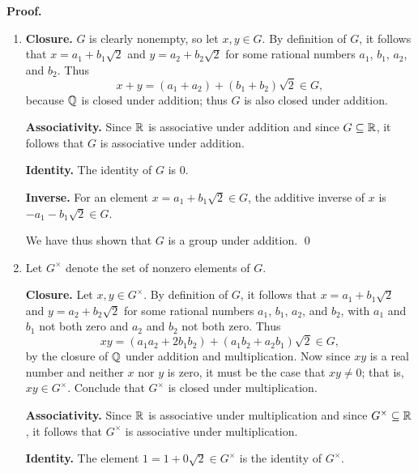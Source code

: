 \begin{enumerate}
      \textbf{Proof.}
      
      \begin{enumerate}
         \item \textbf{Closure.} $G$ is clearly nonempty, so let $x, y \in G$.
               By definition of $G$, it follows that $x = a_1 + b_1\sqrt{2}$ and
               $y = a_2 + b_2\sqrt{2}$ for some rational numbers $a_1$, $b_1$,
               $a_2$, and $b_2$. Thus
               $$x + y = (a_1 + a_2) + (b_1 + b_2)\sqrt{2} \in G,$$
               because $\mathbb{Q}$ is closed under addition; thus $G$ is also closed 
               under addition.
               
               \textbf{Associativity.} Since $\mathbb{R}$ is associative under addition
               and since $G \subseteq \mathbb{R}$, it follows that $G$ is associative
               under addition.
               
               \textbf{Identity.} The identity of $G$ is 0.
               
               \textbf{Inverse.} For an element $x = a_1 + b_1\sqrt{2} \in G$,
               the additive inverse of $x$ is $-a_1 - b_1\sqrt{2} \in G$.
               
               We have thus shown that $G$ is a group under addition. \qed
         \item Let $G^{\times}$ denote the set of nonzero elements of $G$.
         
               \textbf{Closure.} Let $x, y \in G^{\times}$. By definition of
               $G$, it follows that $x = a_1 + b_1\sqrt{2}$ and
               $y = a_2 + b_2\sqrt{2}$ for some rational numbers $a_1$, $b_1$,
               $a_2$, and $b_2$, with $a_1$ and $b_1$ not both zero and $a_2$
               and $b_2$ not both zero. Thus
               $$xy = (a_1a_2 + 2b_1b_2) + (a_1b_2 + a_2b_1)\sqrt{2} \in G,$$
               by the closure of $\mathbb{Q}$ under addition and multiplication. Now
               since $xy$ is a real number and neither $x$ nor $y$ is zero, it 
               must be the case that $xy \neq 0$; that is,
               $xy \in  G^{\times}$. Conclude that $G^{\times}$ is closed under 
               multiplication.
               
               \textbf{Associativity.} Since $\mathbb{R}$ is associative under
               multiplication and since $G^{\times} \subseteq \mathbb{R}$, it follows
               that $G^{\times}$ is associative under multiplication.
               
               \textbf{Identity.} The element $1 = 1 + 0\sqrt{2} \in G^{\times}$
               is the identity of $G^{\times}$.
               

\end{enumerate}
\end{enumerate}
